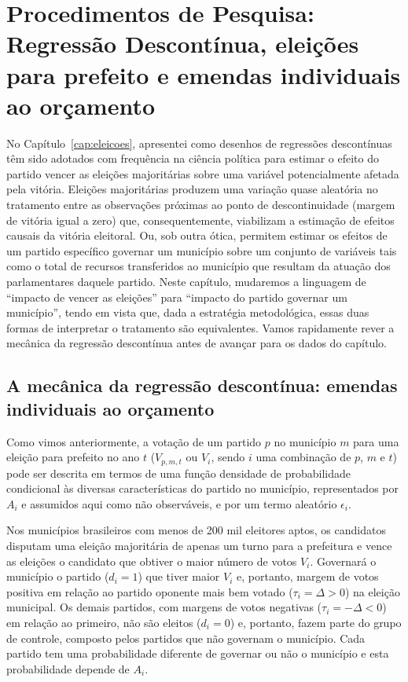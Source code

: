 \section{Procedimentos de Pesquisa: Regressão Descontínua, eleições para prefeito e emendas individuais ao orçamento}

No Capítulo~\ref{cap:eleicoes}, apresentei como desenhos de regressões descontínuas têm sido adotados com frequência na ciência política para estimar o efeito do partido vencer as eleições majoritárias sobre uma variável potencialmente afetada pela vitória. Eleições majoritárias produzem uma variação quase aleatória no tratamento entre as observações próximas ao ponto de descontinuidade (margem de vitória igual a zero) que, consequentemente, viabilizam a estimação de efeitos causais da vitória eleitoral. Ou, sob outra ótica, permitem estimar os efeitos de um partido específico governar um município sobre um conjunto de variáveis tais como o total de recursos transferidos ao município que resultam da atuação dos parlamentares daquele partido. Neste capítulo, mudaremos a linguagem de ``impacto de vencer as eleições'' para ``impacto do partido governar um município'', tendo em vista que, dada a estratégia metodológica, essas duas formas de interpretar o tratamento são equivalentes. Vamos rapidamente rever a mecânica da regressão descontínua antes de avançar para os dados do capítulo.

\subsection{A mecânica da regressão descontínua: emendas individuais ao orçamento}

Como vimos anteriormente, a votação de um partido $p$ no município $m$ para uma eleição para prefeito no ano $t$ ($V_{p,m,t}$ ou $V_{i}$, sendo $i$ uma combinação de $p$, $m$ e $t$) pode ser descrita em termos de uma função densidade de probabilidade condicional às diversas características do partido no município, representados por $A_{i}$ e assumidos aqui como não observáveis, e por um termo aleatório $\epsilon_{i}$. 

Nos municípios brasileiros com menos de 200 mil eleitores aptos, os candidatos disputam uma eleição majoritária de apenas um turno para a prefeitura e vence as eleições o candidato que obtiver o maior número de votos $V_{i}$. Governará o município o partido ($d_{i}=1$) que tiver maior $V_{i}$ e, portanto, margem de votos positiva em relação ao partido oponente mais bem votado ($\tau_{i}=\Delta>0$) na eleição municipal. Os demais partidos, com margens de votos negativas ($\tau_{i}=-\Delta<0$) em relação ao primeiro, não são eleitos ($d_{i}=0$) e, portanto, fazem parte do grupo de controle, composto pelos partidos que não governam o município. Cada partido tem uma probabilidade diferente de governar ou não o município e esta probabilidade depende de $A_{i}$.


